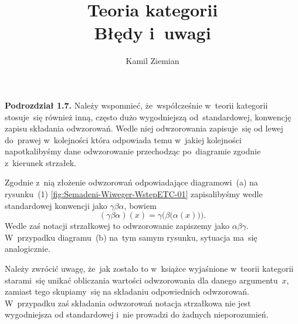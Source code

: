 \documentclass[a4paper,11pt]{article}
\title{Teoria kategorii \\
  {\Large Błędy i~uwagi}}
\author{Kamil Ziemian}
\begin{document}





\maketitle %






\vspace{0em}



\vspace{0em}


\noindent
\textbf{Podrozdział 1.7.} Należy wspomnieć, że~współcześnie w~teorii
kategorii stosuje~się również inną, często dużo wygodniejszą
od~standardowej, konwencję zapisu składania odwzorowań. Wedle niej
odwzorowania zapisuje~się od lewej do~prawej w~kolejności która odpowiada
temu w~jakiej kolejności napotkalibyśmy dane odwzorowanie przechodząc
po~diagramie zgodnie z~kierunek strzałek.

Zgodnie z~nią złożenie odwzorowań odpowiadające diagramowi~(a) na
rysunku~(1) \eqref{fig:Semadeni-Wiweger-WstepETC-01} zapisalibyśmy wedle
standardowej konwencji jako $\gamma \beta \alpha$, bowiem
\begin{equation}
  \label{eq:Semadeni-Wiweger-WstepETC-01}
  ( \gamma \beta \alpha )( x ) = \gamma\big( \beta\big( \alpha( x ) \big) \big).
\end{equation}
Wedle zaś notacji strzałkowej to odwzorowanie zapiszemy jako $\alpha \beta \gamma$.
W~przypadku diagramu~(b) na~tym samym rysunku, sytuacja ma~się analogicznie.

Należy zwrócić uwagę, że~jak zostało to w~książce wyjaśnione w~teorii
kategorii starami~się unikać obliczania wartości odwzorowania dla danego
argumentu~$x$, zamiast tego skupiamy~się na składaniu odpowiednich
odwzorowań. W~przypadku zaś składania odwzorowań notacja strzałkowa nie jest
wygodniejsza od standardowej i~nie prowadzi do żadnych nieporozumień.
\end{document}
